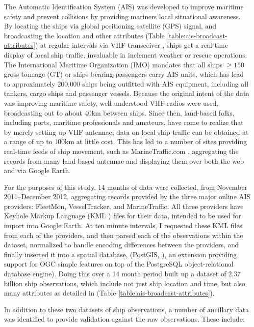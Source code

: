 The Automatic Identification System (AIS) \citep{Tetreault2002} was developed to improve maritime safety and prevent collisions by providing mariners local situational awareness. By locating the ships via global positioning satellite (GPS) signal, and broadcasting the location and other attributes (Table \ref{table:ais-broadcast-attributes}) at regular intervals via VHF transceiver \citep{Itu-r2010}, ships get a real-time display of local ship traffic, invaluable in inclement weather or rescue operations.  The International Maritime Organization (IMO) mandates that all ships $\geq150$ gross tonnage (GT) or ships bearing passengers carry AIS units, which has lead to approximately 200,000 ships being outfitted with AIS equipment, including all tankers, cargo ships and passenger vessels. Because the original intent of the data was improving maritime safety, well-understood VHF radios were used, broadcasting out to about 40km between ships. Since then, land-based folks, including ports, maritime professionals and amateurs, have come to realize that by merely setting up VHF antennae, data on local ship traffic can be obtained at a range of up to 100km at little cost. This has led to a number of sites providing real-time feeds of ship movement, such as MarineTraffic.com \citep{MarineTraffic}, aggregating the records from many land-based antennae and displaying them over both the web and via Google Earth. 

For the purposes of this study, 14 months of data were collected, from November 2011--December 2012, aggregating records provided by the three major online AIS providers: FleetMon, VesselTracker, and MarineTraffic. All three providers have Keyhole Markup Language (KML \cite{KML}) files for their data, intended to be used for import into Google Earth. At ten minute intervals, I requested these KML files from each of the providers, and then parsed each of the observations within the dataset, normalized to handle encoding differences between the providers, and finally inserted it into a spatial database, (PostGIS, \cite{ramsey2005postgis}), an extension providing support for OGC simple features on top of the PostgreSQL \citep{postgresql} object-relational database engine). Doing this over a 14 month period built up a dataset of 2.37 billion ship observations, which include not just ship location and time, but also many attributes as detailed in (Table \ref{table:ais-broadcast-attributes}).

In addition to these two datasets of ship observations, a number of ancillary data was identified to provide validation against the raw observations. These include: 

